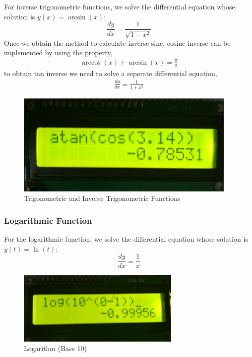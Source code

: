 \documentclass[a4paper,12pt]{article}
\begin{document}
For inverse trigonometric functions, we solve the differential equation whose solution is \( y(x) = \arcsin(x) \):
\[
\frac{dy}{dx} = \frac{1}{\sqrt{1 - x^2}}
\]
Once we obtain the method to calculate inverse sine, cosine inverse can be implemented by using the property, 
\begin{align*}
    \arccos(x) + \arcsin(x) = \frac{\pi}{2}
\end{align*}
to obtain tan inverse we need to solve a seperate differential equation,
\begin{align*}
    \frac{dy}{dx} = \frac{1}{1+x^2}
\end{align*}
\begin{figure}
  \begin{center}
    \includegraphics[width=0.95\textwidth]{figs/trig.png}
  \end{center}
  \caption{Trigonometric and Inverse Trigonometric Functions}\label{fig:Trigonometric and Inverse Trigonometric Functions}
\end{figure}

\subsubsection*{Logarithmic Function}

For the logarithmic function, we solve the differential equation whose solution is \( y(t) = \ln(t) \):
\[
\frac{dy}{dx} = \frac{1}{x}
\]
\begin{figure}[h!]
  \begin{center}
    \includegraphics[width=0.7\textwidth]{figs/ln.png}
  \end{center}
  \caption{Logarithm (Base 10)}\label{fig:Log base 10}
\end{figure}
\end{document}
